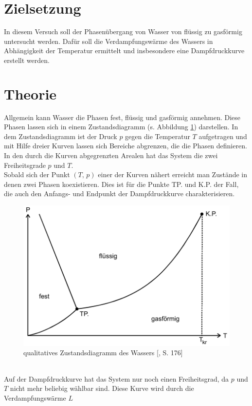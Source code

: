 \section{Zielsetzung}
In diesem Versuch soll der Phasenübergang von Wasser von flüssig zu gasförmig untersucht werden.
Dafür soll die Verdampfungswärme des Wassers in Abhängigkeit der Temperatur ermittelt und insbesondere eine Dampfdruckkurve
erstellt werden.

\section{Theorie}
\label{sec:Theorie}
Allgemein kann Wasser die Phasen fest, flüssig und gasförmig annehmen. Diese Phasen lassen sich in einem Zustandsdiagramm (s. Abbildung \ref{fig:pV-Diagramm})
darstellen. In dem Zustandsdiagramm ist der Druck $p$ gegen die Temperatur $T$ aufgetragen und mit Hilfe dreier Kurven lassen sich Bereiche abgrenzen, die 
die Phasen definieren. In den durch die Kurven abgegrenzten Arealen hat das System die zwei Freiheitsgrade $p$ und $T$.\\
Sobald sich der Punkt $(T{,}\,p)$ einer der Kurven nähert erreicht man Zustände in denen zwei Phasen koexistieren. Dies ist für die Punkte TP. und K.P. der Fall, die
auch den Anfangs- und Endpunkt der Dampfdruckkurve charakterisieren.\\
\begin{figure}
    \centering
    \includegraphics{Theorie1.png}
    \caption{qualitatives Zustandsdiagramm des Wassers [\cite{sample}, S. 176]}
    \label{fig:pV-Diagramm}
\end{figure}
\\
Auf der Dampfdruckkurve hat das System nur noch einen Freiheitsgrad, da $p$ und $T$ nicht mehr beliebig wählbar sind. Diese Kurve wird durch die Verdampfungswärme $L$
